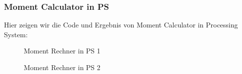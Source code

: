 \documentclass[a4paper]{report}
\begin{document}
\newpage 
\subsubsection{Moment Calculator in PS}
Hier zeigen wir die Code und Ergebnis von Moment Calculator in Processing System:

\begin{figure}[H]
\centering
{}
\caption{Moment Rechner in PS 1}
\label{fig:Moment Rechner_in_PS_1}
\end{figure}


\begin{figure}[H]
\centering
{}
\caption{Moment Rechner in PS 2}
\label{fig:Moment Rechner_in_PS_2}
\end{figure}
\end{document}
